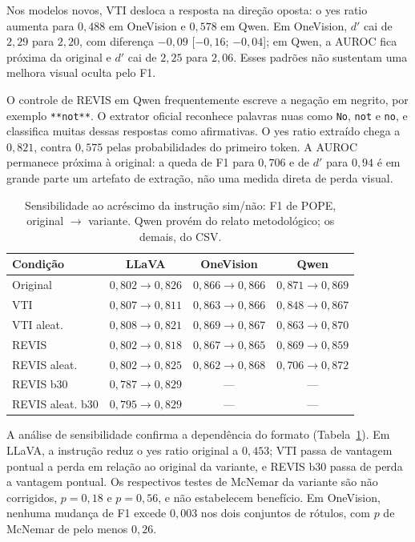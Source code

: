 Nos modelos novos, VTI desloca a resposta na direção oposta: o yes ratio aumenta para $0{,}488$ em OneVision e $0{,}578$ em Qwen. Em OneVision, $d'$ cai de $2{,}29$ para $2{,}20$, com diferença $-0{,}09$ [$-0{,}16$; $-0{,}04$]; em Qwen, a AUROC fica próxima da original e $d'$ cai de $2{,}25$ para $2{,}06$. Esses padrões não sustentam uma melhora visual oculta pelo F1.

O controle de REVIS em Qwen frequentemente escreve a negação em negrito, por exemplo \texttt{**not**}. O extrator oficial reconhece palavras nuas como \texttt{No}, \texttt{not} e \texttt{no}, e classifica muitas dessas respostas como afirmativas. O yes ratio extraído chega a $0{,}821$, contra $0{,}575$ pelas probabilidades do primeiro token. A AUROC permanece próxima à original: a queda de F1 para $0{,}706$ e de $d'$ para $0{,}94$ é em grande parte um artefato de extração, não uma medida direta de perda visual.

\begin{table}[t]
\centering\small
\caption{Sensibilidade ao acréscimo da instrução sim/não: F1 de POPE, original $\rightarrow$ variante. Qwen provém do relato metodológico; os demais, do CSV.}
\label{tab:yn}
\setlength{\tabcolsep}{2pt}
\begin{tabular}{lccc}\toprule
Condição & LLaVA & OneVision & Qwen \\
\midrule
Original & $0{,}802\to0{,}826$ & $0{,}866\to0{,}866$ & $0{,}871\to0{,}869$ \\
VTI & $0{,}807\to0{,}811$ & $0{,}863\to0{,}866$ & $0{,}848\to0{,}867$ \\
VTI aleat. & $0{,}808\to0{,}821$ & $0{,}869\to0{,}867$ & $0{,}863\to0{,}870$ \\
REVIS & $0{,}802\to0{,}818$ & $0{,}867\to0{,}865$ & $0{,}869\to0{,}859$ \\
REVIS aleat. & $0{,}802\to0{,}825$ & $0{,}862\to0{,}868$ & $0{,}706\to0{,}872$ \\
REVIS b30 & $0{,}787\to0{,}829$ & --- & --- \\
REVIS aleat. b30 & $0{,}795\to0{,}829$ & --- & --- \\
\bottomrule\end{tabular}
\end{table}

A análise de sensibilidade confirma a dependência do formato (Tabela~\ref{tab:yn}). Em LLaVA, a instrução reduz o yes ratio original a $0{,}453$; VTI passa de vantagem pontual a perda em relação ao original da variante, e REVIS b30 passa de perda a vantagem pontual. Os respectivos testes de McNemar da variante são não corrigidos, $p=0{,}18$ e $p=0{,}56$, e não estabelecem benefício. Em OneVision, nenhuma mudança de F1 excede $0{,}003$ nos dois conjuntos de rótulos, com $p$ de McNemar de pelo menos $0{,}26$.

